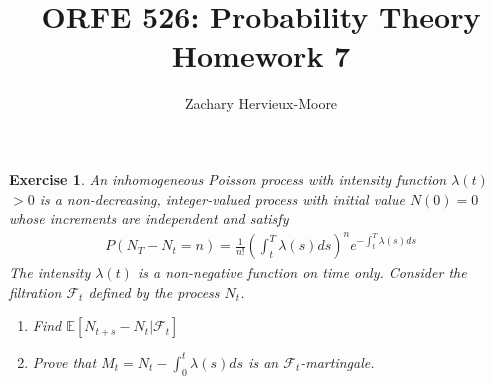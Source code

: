 \documentclass[12pt]{article}
\title{ORFE 526: Probability Theory \\ Homework 7}
\author{Zachary Hervieux-Moore}
\date{\displaydate{date}}
\theoremstyle{colon}
\newtheorem{exercise}{Exercise}
\begin{document}
\maketitle

\clearpage

\begin{exercise}
  An inhomogeneous Poisson process with intensity function $\lambda(t)$ $> 0$ is a non-decreasing, integer-valued process with initial value $N(0) = 0$ whose increments are independent and satisfy
  \begin{gather*}
    P(N_T - N_t = n) = \frac{1}{n!} \left( \int_t^T \lambda(s)ds \right)^n e^{-\int_t^T \lambda(s)ds}
  \end{gather*}
  The intensity $\lambda(t)$ is a non-negative function on time only. Consider the filtration $\mathcal{F}_t$ defined by the process $N_t$.
  \begin{enumerate}[label=\alph*)]
    \item Find $\mathbb{E}[N_{t+s} - N_t | \mathcal{F}_t]$
    \item Prove that $M_t = N_t - \int_0^t \lambda(s) ds$ is an $\mathcal{F}_t$-martingale.
  \end{enumerate}
\end{exercise}
\end{document}
